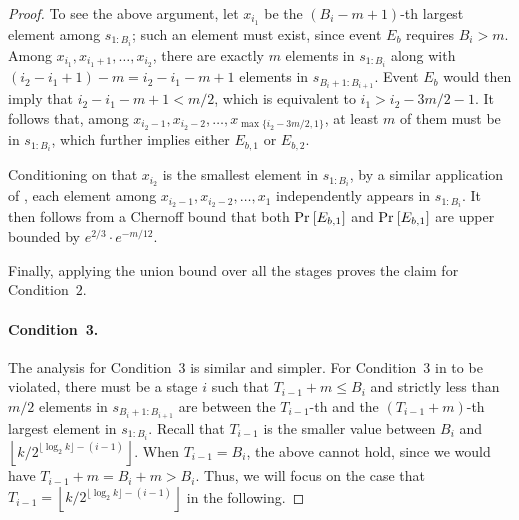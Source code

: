 \begin{proof}
To see the above argument, let $x_{i_1}$ be the $\left(B_i - m+1\right)$-th largest element among $s_{1:B_i}$; such an element must exist, since event $E_b$ requires $B_i > m$. Among $x_{i_1}, x_{i_1 + 1}, \ldots, x_{i_2}$, there are exactly $m $ elements in $s_{1:B_i}$ along with $(i_2 - i_1 + 1) - m = i_2 - i_1 - m+1$ elements in $s_{B_i + 1: B_{i+1}}$. Event $E_b$ would then imply that $i_2 - i_1 - m +1< m/2$, which is equivalent to $i_1 > i_2 - 3m/2-1$. It follows that, among $x_{i_2 -1}, x_{i_2-2}, \ldots, x_{\max\{i_2 - 3m/2, 1\}}$, at least $m$ of them must be in $s_{1:B_i}$, which further implies either $E_{b,1}$ or $E_{b,2}$.

Conditioning on that $x_{i_2}$ is the smallest element in $s_{1:B_i}$, by a similar application of , each element among $x_{i_2 - 1}, x_{i_2 - 2}, \ldots, x_1$ independently appears in $s_{1:B_i}$. It then follows from a Chernoff bound that both $\Pr_{}\left[E_{b,1}\right]$ and $\Pr_{}\left[E_{b,1}\right]$ are upper bounded by $e^{2/3}\cdot e^{-m/12}$.

Finally, applying the union bound over all the stages proves the claim for Condition~$2$.

\paragraph{Condition~3.} The analysis for Condition~3 is similar and simpler. For Condition~$3$ in  to be violated, there must be a stage $i$ such that $T_{i-1} + m \le B_i$ and strictly less than $m/2$ elements in $s_{B_i+1:B_{i+1}}$ are between the $T_{i-1}$-th and the $(T_{i-1} + m)$-th largest element in $s_{1:B_i}$. Recall that $T_{i-1}$ is the smaller value between $B_i$ and $\left\lfloor k/2^{\lfloor\log_2 k\rfloor - (i-1)}\right\rfloor$. When $T_{i-1} = B_i$, the above cannot hold, since we would have $T_{i-1} + m = B_i + m > B_i$. Thus, we will focus on the case that $T_{i-1} = \left\lfloor k/2^{\lfloor\log_2 k\rfloor - (i-1)}\right\rfloor$ in the following.


\end{proof}
